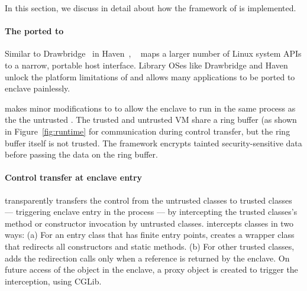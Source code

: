\label{sec:implementation}

In this section, we discuss in detail about how the framework of \sysname{}
is implemented. 

\paragraph{The \graphene{} \libos{} ported to \sgx{}}
Similar to Drawbridge~\cite{porter11drawbridge}
in Haven~\cite{baumann14haven},
\graphene{}~\cite{tsai14graphene} maps a larger number of Linux system APIs
to a narrow, portable host interface.
Library OSes like Drawbridge and Haven unlock the platform limitations of \sgx{} and
allows many applications to be ported to enclave painlessly.

 
\sysname{} makes minor modifications to \graphene{} to allow
the enclave to run
in the same process as the the untrusted \jvm{}.
The trusted and untrusted VM share a ring buffer (as shown in Figure~\ref{fig:runtime} for communication during control transfer,
but the ring buffer itself is not trusted. The \sysname{} framework encrypts tainted security-sensitive data before passing the data on the ring buffer.
 
\paragraph{Control transfer at enclave entry}

\sysname{} transparently transfers the control from the untrusted classes to trusted classes --- triggering enclave entry in the process ---
by intercepting the trusted classes's method or constructor invocation by untrusted classes.
\sysname{} intercepts classes in two ways:
(a) For an entry class that has finite entry points,
\sysname{} creates a wrapper class that redirects all constructors and static methods.
(b) For other trusted classes, \sysname{} adds the redirection calls only when a reference is returned by the enclave. %
On future access of the object in the enclave, a proxy object is created to trigger the interception, using CGLib.

